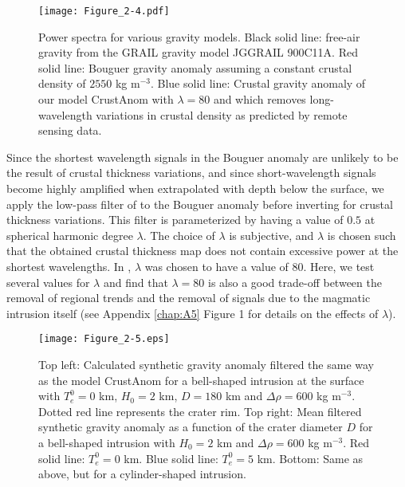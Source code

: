 \begin{figure}[h!]
  \graphicspath{ {/Users/thorey/Documents/These/Projet/FFC/Gravi_GRAIL/Article/Papier/SOUMISSION_2_EPSL/} }
  \begin{center}
    \texttt{[image: Figure\_2-4.pdf]}
    \caption{Power spectra  for various  gravity models.   Black solid
      line:  free-air gravity  from  the GRAIL  gravity model  JGGRAIL
      900C11A.   Red solid  line: Bouguer  gravity anomaly  assuming a
      constant  crustal density  of  $2550$ kg  m$^{-3}$.  Blue  solid
      line:  Crustal  gravity  anomaly  of our  model  CrustAnom  with
      $\lambda=80$  and which  removes  long-wavelength variations  in
      crustal density as predicted by remote sensing data.}
    \label{Figure2-4}
  \end{center}
\end{figure}

Since  the shortest  wavelength  signals in  the  Bouguer anomaly  are
unlikely to be  the result of crustal thickness  variations, and since
short-wavelength  signals become  highly  amplified when  extrapolated
with  depth  below  the  surface,  we apply  the  low-pass  filter  of
\citet{wieczorek:1998th} to  the Bouguer anomaly before  inverting for
crustal thickness variations.  This  filter is parameterized by having
a value of $0.5$ at spherical harmonic degree $\lambda$. The choice of
$\lambda$  is  subjective,  and  $\lambda$ is  chosen  such  that  the
obtained crustal thickness map does not contain excessive power at the
shortest  wavelengths.   In \citet{Wieczorek:2013ipa},  $\lambda$  was
chosen to  have a  value of  $80$.  Here, we  test several  values for
$\lambda$ and find that $\lambda=80$  is also a good trade-off between
the removal of  regional trends and the removal of  signals due to the
magmatic  intrusion itself  (see Appendix  \ref{chap:A5} Figure  1 for
details on the effects of $\lambda$).

\begin{figure}[h!]
  \graphicspath{ {/Users/thorey/Documents/These/Projet/FFC/Gravi_GRAIL/Article/Papier/SOUMISSION_2_EPSL/} }
  \begin{center}
    \texttt{[image: Figure\_2-5.eps]}
    \caption{Top left:  Calculated synthetic gravity  anomaly filtered
      the same way as the  model CrustAnom for a bell-shaped intrusion
      at the surface with  $T_e^0 = 0$ km, $H_0 = 2$ km,  $D = 180$ km
      and $\Delta \rho = 600$ kg m$^{-3}$.  Dotted red line represents
      the  crater  rim. Top  right:  Mean  filtered synthetic  gravity
      anomaly  as  a  function  of  the  crater  diameter  $D$  for  a
      bell-shaped intrusion with $H_0 = 2$  km and $\Delta \rho = 600$
      kg m$^{-3}$.  Red  solid line: $T_e^0 =0$ km.   Blue solid line:
      $T_e^0   =  5$   km.   Bottom:   Same  as   above,  but   for  a
      cylinder-shaped intrusion.}
    \label{Figure2-5}
  \end{center}
\end{figure}

